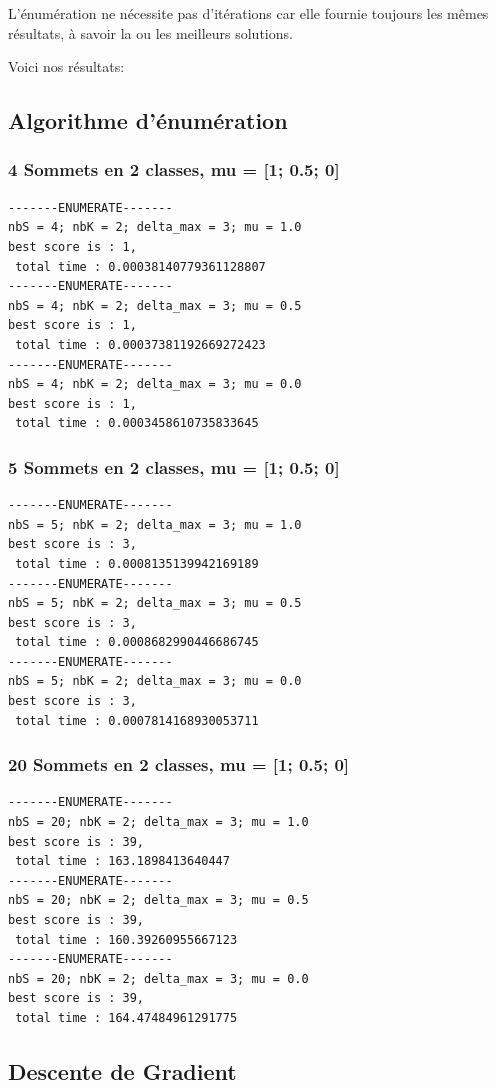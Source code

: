\documentclass[a4paper]{article}
\begin{document}
L'énumération ne nécessite pas d'itérations car elle fournie toujours les mêmes résultats, à savoir la ou les meilleurs solutions.

Voici nos résultats:

\subsection{Algorithme d'énumération}
\subsubsection{4 Sommets en 2 classes, mu = [1; 0.5; 0]}
\begin{verbatim}
-------ENUMERATE-------
nbS = 4; nbK = 2; delta_max = 3; mu = 1.0
best score is : 1,
 total time : 0.00038140779361128807
-------ENUMERATE-------
nbS = 4; nbK = 2; delta_max = 3; mu = 0.5
best score is : 1,
 total time : 0.00037381192669272423
-------ENUMERATE-------
nbS = 4; nbK = 2; delta_max = 3; mu = 0.0
best score is : 1,
 total time : 0.0003458610735833645
\end{verbatim}
\subsubsection{5 Sommets en 2 classes, mu = [1; 0.5; 0]}
\begin{verbatim}
-------ENUMERATE-------
nbS = 5; nbK = 2; delta_max = 3; mu = 1.0
best score is : 3,
 total time : 0.0008135139942169189
-------ENUMERATE-------
nbS = 5; nbK = 2; delta_max = 3; mu = 0.5
best score is : 3,
 total time : 0.0008682990446686745
-------ENUMERATE-------
nbS = 5; nbK = 2; delta_max = 3; mu = 0.0
best score is : 3,
 total time : 0.0007814168930053711
\end{verbatim}
\subsubsection{20 Sommets en 2 classes, mu = [1; 0.5; 0]}
\begin{verbatim}
-------ENUMERATE-------
nbS = 20; nbK = 2; delta_max = 3; mu = 1.0
best score is : 39,
 total time : 163.1898413640447
-------ENUMERATE-------
nbS = 20; nbK = 2; delta_max = 3; mu = 0.5
best score is : 39,
 total time : 160.39260955667123
-------ENUMERATE-------
nbS = 20; nbK = 2; delta_max = 3; mu = 0.0
best score is : 39,
 total time : 164.47484961291775
\end{verbatim}

\subsection{Descente de Gradient}
\end{document}
